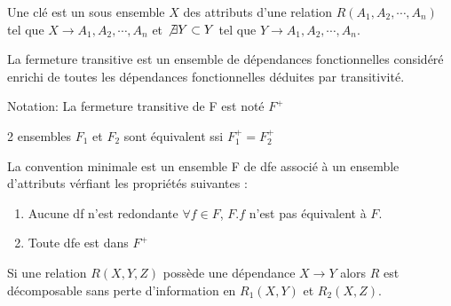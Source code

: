 \documentclass[12pt,a4paper,openany]{book}
\begin{document}
		\begin{definition}
			Une clé est un sous ensemble $X$ des attributs d'une relation $R(A_1,A_2,\cdots,A_n)$
			tel que $X\rightarrow A_1,A_2,\cdots,A_n$ et $\not\exists Y \subset Y$ tel que $Y\rightarrow A_1,A_2,\cdots,A_n$.
		\end{definition}
		
		\begin{definition}
			La fermeture transitive est un ensemble de dépendances fonctionnelles considéré enrichi de toutes les dépendances fonctionnelles déduites
			par transitivité.

			Notation: La fermeture transitive de F est noté $F^+$
		\end{definition}

		\begin{definition}
			2 ensembles $F_1$ et $F_2$ sont équivalent ssi $F_1^+ = F_2^+$	
		\end{definition}

		\begin{definition}
			La convention minimale est un ensemble F de dfe associé à un ensemble d'attributs vérfiant les propriétés suivantes : 
			\begin{enumerate}
				\item Aucune df n'est redondante $\forall f \in F$, $F.f$ n'est pas équivalent à $F$.
				\item Toute dfe est dans $F^+$
			\end{enumerate}
		\end{definition}

		\begin{proposition}
			Si une relation $R(X,Y,Z)$ possède une dépendance $X\rightarrow Y$ alors $R$ est décomposable sans perte d'information en $R_1(X,Y)$ et
			$R_2(X,Z)$.
		\end{proposition}
\end{document}
